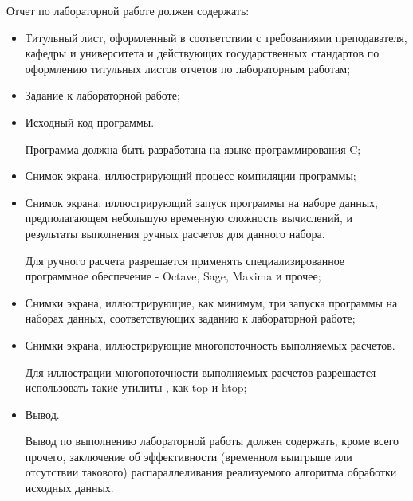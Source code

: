 
Отчет по лабораторной работе должен содержать:

\begin{itemize}

	\item Титульный лист, оформленный в соответствии с требованиями преподавателя, кафедры и университета и действующих государственных стандартов по оформлению титульных листов отчетов по лабораторным работам;
	
	\item Задание к лабораторной работе;

	\item Исходный код программы.

	Программа должна быть разработана на языке программирования C;

	\item Снимок экрана, иллюстрирующий процесс компиляции программы;

	\item Снимок экрана, иллюстрирующий запуск программы на наборе данных, предполагающем небольшую временную сложность вычислений, и результаты выполнения ручных расчетов для данного набора.

	Для ручного расчета разрешается применять специализированное программное обеспечение - Octave, Sage, Maxima и прочее;

	\item Снимки экрана, иллюстрирующие, как минимум, три запуска программы на наборах данных, соответствующих заданию к лабораторной работе;

	\item Снимки экрана, иллюстрирующие многопоточность выполняемых расчетов.

	Для иллюстрации многопоточности выполняемых расчетов разрешается использовать такие утилиты \gl, как top и htop;

	\item Вывод.

	Вывод по выполнению лабораторной работы должен содержать, кроме всего прочего, заключение об эффективности (временном выигрыше или отсутствии такового) распараллеливания реализуемого алгоритма обработки исходных данных.

\end{itemize}

